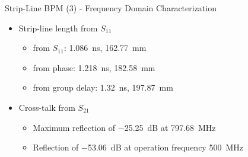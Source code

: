 \documentclass{beamer}
\begin{document}
\begin{frame}[t,fragile]{Strip-Line BPM (3) - Frequency Domain Characterization}
\begin{itemize}
\item Strip-line length from $S_{11}$
\begin{itemize}
\item from $S_{11}$: \SI{1.086}{\nano\second}, \SI{162.77}{\mm}
\item from phase: \SI{1.218}{\nano\second}, \SI{182.58}{\mm}
\item from group delay: \SI{1.32}{\nano\second}, \SI{197.87}{\mm}
\end{itemize}
\item Cross-talk from $S_{21}$
\begin{itemize}
\item Maximum reflection of \SI{-25.25}{\dB} at \SI{797.68}{\MHz}
\item Reflection of \SI{-53.06}{\dB} at operation frequency \SI{500}{\MHz}
\end{itemize}
\end{itemize}

\begin{figure}
  \centering
  \quad
  \\
\end{figure}

\end{frame}
\end{document}
